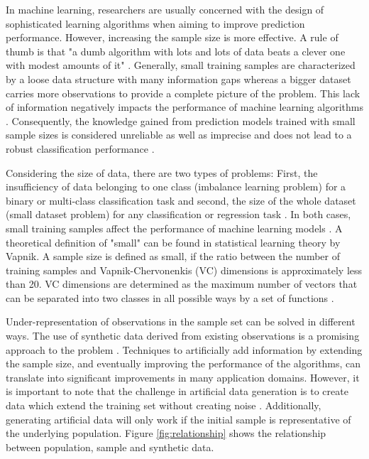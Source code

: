 \documentclass[parskip=full]{scrartcl}
\begin{document}
In machine learning, researchers are usually concerned with the design of
sophisticated learning algorithms when aiming to improve prediction performance.
However, increasing the sample size is more effective. A rule of thumb is that
"a dumb algorithm with lots and lots of data beats a clever one with modest
amounts of it" \cite{Domingos.2012}. Generally, small training samples are
characterized by a loose data structure with many information gaps whereas a
bigger dataset carries more observations to provide a complete picture of the
problem. This lack of information negatively impacts the performance of machine
learning algorithms \cite{Lin.2018}. Consequently, the knowledge gained from
prediction models trained with small sample sizes is considered unreliable as
well as imprecise and does not lead to a robust classification performance
\cite{AbdulLateh.2017}.

Considering the size of data, there are two types of problems: First, the
insufficiency of data belonging to one class (imbalance learning problem) for a
binary or multi-class classification task and second, the size of the whole
dataset (small dataset problem) for any classification or regression task
\cite{Sezer.2014}. In both cases, small training samples affect the performance
of machine learning models \cite{Tsai.2008}. A theoretical definition of "small"
can be found in statistical learning theory by Vapnik. A sample size is defined
as small, if the ratio between the number of training samples and
Vapnik-Chervonenkis (VC) dimensions is approximately less than 20. VC dimensions
are determined as the maximum number of vectors that can be separated into two
classes in all possible ways by a set of functions \cite{Vapnik.2008}.

Under-representation of observations in the sample set can be solved in
different ways. The use of synthetic data derived from existing observations is
a promising approach to the problem \cite{Sezer.2014}. Techniques to
artificially add information by extending the sample size, and eventually
improving the performance of the algorithms, can translate into significant
improvements in many application domains. However, it is important to note that
the challenge in artificial data generation is to create data which extend the
training set without creating noise \cite{Li.2006}. Additionally, generating
artificial data will only work if the initial sample is representative of the
underlying population. Figure \ref{fig:relationship} shows the relationship
between population, sample and synthetic data.
\end{document}
